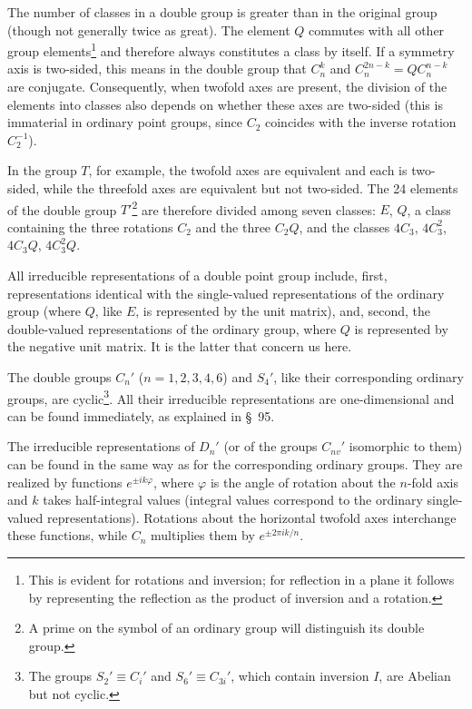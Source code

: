 The number of classes in a double group is greater than in the original group (though not generally twice as great). The element $Q$ commutes with all other group elements\footnote{This is evident for rotations and inversion; for reflection in a plane it follows by representing the reflection as the product of inversion and a rotation.} and therefore always constitutes a class by itself. If a symmetry axis is two-sided, this means in the double group that $C_n^k$ and $C_n^{2n-k}=QC_n^{n-k}$ are conjugate. Consequently, when twofold axes are present, the division of the elements into classes also depends on whether these axes are two-sided (this is immaterial in ordinary point groups, since $C_2$ coincides with the inverse rotation $C_2^{-1}$).

In the group $T$, for example, the twofold axes are equivalent and each is two-sided, while the threefold axes are equivalent but not two-sided. The 24 elements of the double group $T'$\footnote{A prime on the symbol of an ordinary group will distinguish its double group.} are therefore divided among seven classes: $E$, $Q$, a class containing the three rotations $C_2$ and the three $C_2Q$, and the classes $4C_3$, $4C_3^2$, $4C_3Q$, $4C_3^2Q$.

All irreducible representations of a double point group include, first, representations identical with the single-valued representations of the ordinary group (where $Q$, like $E$, is represented by the unit matrix), and, second, the double-valued representations of the ordinary group, where $Q$ is represented by the negative unit matrix. It is the latter that concern us here.

The double groups $C_n'$ ($n=1,2,3,4,6$) and $S_4'$, like their corresponding ordinary groups, are cyclic\footnote{The groups $S_2'\equiv C_i'$ and $S_6'\equiv C_{3i}'$, which contain inversion $I$, are Abelian but not cyclic.}. All their irreducible representations are one-dimensional and can be found immediately, as explained in \S~95.

The irreducible representations of $D_n'$ (or of the groups $C_{nv}'$ isomorphic to them) can be found in the same way as for the corresponding ordinary groups. They are realized by functions $e^{\pm ik\varphi}$, where $\varphi$ is the angle of rotation about the $n$-fold axis and $k$ takes half-integral values (integral values correspond to the ordinary single-valued representations). Rotations about the horizontal twofold axes interchange these functions, while $C_n$ multiplies them by $e^{\pm2\pi ik/n}$.

